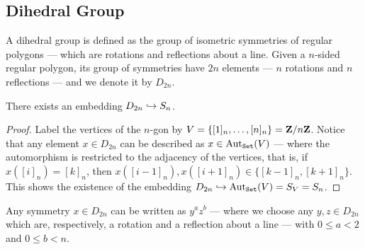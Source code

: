 \subsection{Dihedral Group}

\begin{definition}\label{def: dihedral}
    A dihedral group is defined as the group of isometric symmetries of regular
    polygons --- which are rotations and reflections about a line. Given a
    \(n\)-sided regular polygon, its group of symmetries have \(2n\) elements ---
    \(n\) rotations and \(n\) reflections --- and we denote it by \(D_{2n}\).
\end{definition}

\begin{proposition}\label{prop: dihetral-to-sym}
    There exists an embedding \(D_{2n} \hookrightarrow S_n\).
\end{proposition}

\begin{proof}
    Label the vertices of the \(n\)-gon by \(V = \{[1]_n, \dots, [n]_n\} =
    \mathbf{Z}/n\mathbf{Z}\). Notice that any element \(x \in D_{2n}\) can be described as \(x \in
    \operatorname{Aut}_{\texttt{Set}}(V)\) --- where the automorphism is restricted to the adjacency of
    the vertices, that is, if \(x([i]_n) = [k]_n\), then \(x([i - 1]_n), x([i +
            1]_n) \in \{[k - 1]_n, [k + 1]_n\}\). This shows the existence of the
    embedding \(D_{2n} \hookrightarrow \operatorname{Aut}_{\texttt{Set}}(V) = S_V = S_n\).
\end{proof}

\begin{proposition}
    Any symmetry \(x \in D_{2n}\) can be written as \(y^a z^b\) --- where we
    choose any \(y, z \in D_{2n}\) which are, respectively, a rotation and a
    reflection about a line --- with \(0 \leq a < 2\) and \(0 \leq b < n\).
\end{proposition}

